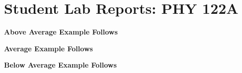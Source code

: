 \documentclass[12pt]{article}
\begin{document}
\newpage
  
  
  

\section{Student Lab Reports: PHY 122A}
\label{sec:supd}
\vskip 8cm
\begin{center}
{\bf \Large Above Average Example Follows}
\end{center}
  
\vskip 8cm
\begin{center}
{\bf \Large Average Example Follows}
\end{center}
  
\vskip 8cm
\begin{center}
{\bf \Large Below Average Example Follows}
\end{center}
  
\end{document}
